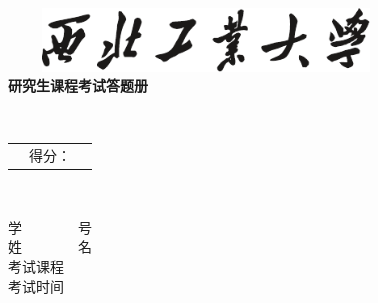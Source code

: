 \begin{titlepage}
	\sSihao ~ \\
	\sSihao ~ \\
	\sSihao ~ \\
	
	\begin{center}
		\includegraphics[width=10.48cm,height=1.69cm]{pic/university_text_logo}\\
		\vspace{9pt}
		\sXiaoyi \bfseries 研究生课程考试答题册
	\end{center}
	
	\sSihao ~ \\
	
	
	
	
	\begin{table}[h]
		\begin{tabular}[c]{m{8cm}|m{4.32cm}|c}
			\cline{2-2}
			& \vspace{.8cm} \sSihao \fKai 得分： \vspace{.8cm} & \\
			\cline{2-2}
			
		\end{tabular}
	\end{table}
	
	\sSihao ~\\
	
	\begin{center}
		{
			\fKai \sSihao 学~~~~~~~~号 \coverunderline[8cm]{}\\
			\fKai \sSihao 姓~~~~~~~~名 \coverunderline[8cm]{}\\
			\fKai \sSihao 考试课程 \\
			\fKai \sSihao 考试时间 
		}
	\end{center}
\end{titlepage}
